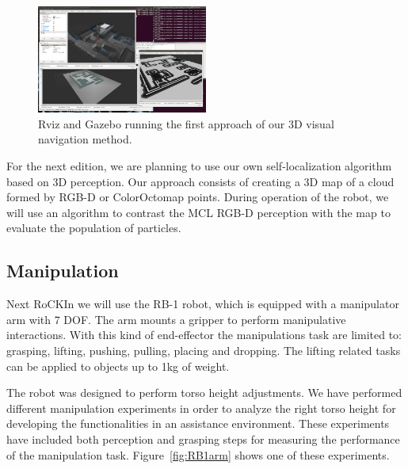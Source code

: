 \documentclass[conference]{IEEEtran}
\begin{document}

\begin{figure}[ht]
  \centering
  \includegraphics[width=0.5\textwidth]{Navigation}
  \caption{Rviz and Gazebo running the first approach of our 3D visual navigation method.} 
  \label{fig:navigation}
\end{figure}




For the next edition, we are planning to use our own self-localization algorithm based on
3D perception. Our approach consists of creating a 3D map of a cloud formed by RGB-D or
ColorOctomap \cite{hornung2013octomap} points. During operation of the robot, we will use an algorithm to
contrast the MCL RGB-D perception with the map to evaluate the population of particles.




\subsection{Manipulation}


Next RoCKIn we will use the RB-1 robot, which is equipped with a manipulator arm with 7 DOF. 
The arm mounts a gripper to perform manipulative interactions. With this kind of end-effector the manipulations task are limited to: grasping, lifting, pushing, pulling, placing and dropping. The lifting related tasks can be applied to objects up to 1kg of weight. 

The robot was designed to perform torso height adjustments.  
We have performed different manipulation experiments in order to analyze the right torso height for developing the functionalities in an assistance environment. These experiments have included both perception and grasping steps for  measuring the performance of the manipulation task. Figure~\ref{fig:RB1arm} shows one of these experiments. 

\end{document}
